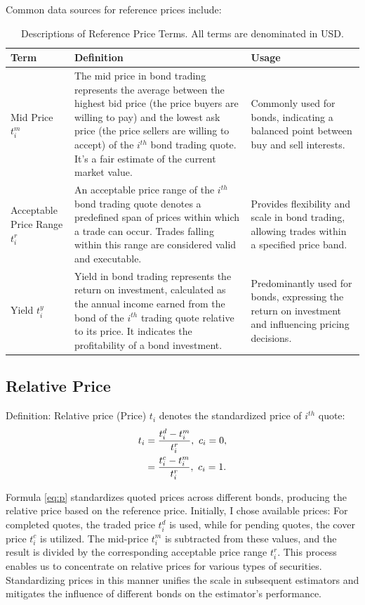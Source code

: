 Common data sources for reference prices include:
\begin{table}[H]
    \caption{Descriptions of Reference Price Terms. All terms are denominated in USD.}
    \label{tab:reference_price_terms}
    \begin{tabular}{|>{\centering\arraybackslash}m{2cm}|>{\centering\arraybackslash}m{7cm}|>{\centering\arraybackslash}m{4cm}|}
    \hline
    \textbf{Term} & \textbf{Definition} & \textbf{Usage} \\
    \hline
    Mid Price $t^m_i$ & The mid price in bond trading represents the average between the highest bid price (the price buyers are willing to pay) and the lowest ask price (the price sellers are willing to accept) of the $i^{th}$ bond trading quote. It's a fair estimate of the current market value. & Commonly used for bonds, indicating a balanced point between buy and sell interests. \\
    \hline
    Acceptable Price Range $t^r_i$ & An acceptable price range of the $i^{th}$ bond trading quote denotes a predefined span of prices within which a trade can occur. Trades falling within this range are considered valid and executable. & Provides flexibility and scale in bond trading, allowing trades within a specified price band. \\
    \hline
    Yield $t^y_i$ & Yield in bond trading represents the return on investment, calculated as the annual income earned from the bond of the $i^{th}$ trading quote relative to its price. It indicates the profitability of a bond investment. & Predominantly used for bonds, expressing the return on investment and influencing pricing decisions. \\
    \hline
    \end{tabular}
\end{table}

\subsection{Relative Price}
Definition: Relative price (Price) $t_i$ denotes the standardized price of $i^{th}$ quote:
\begin{align}
    t_i &= \frac{t^d_i - t^m_i}{t^r_i},\ c_i = 0,\notag \\
    &= \frac{t^c_i - t^m_i}{t^r_i},\ c_i = 1.\label{eq:p}
\end{align}

Formula \eqref{eq:p} standardizes quoted prices across different bonds, producing the relative price based on the reference price. Initially, I chose available prices: For completed quotes, the traded price $t^d_i$ is used, while for pending quotes, the cover price $t^c_i$ is utilized. The mid-price $t^m_i$ is subtracted from these values, and the result is divided by the corresponding acceptable price range $t^r_i$. This process enables us to concentrate on relative prices for various types of securities. Standardizing prices in this manner unifies the scale in subsequent estimators and mitigates the influence of different bonds on the estimator's performance.

